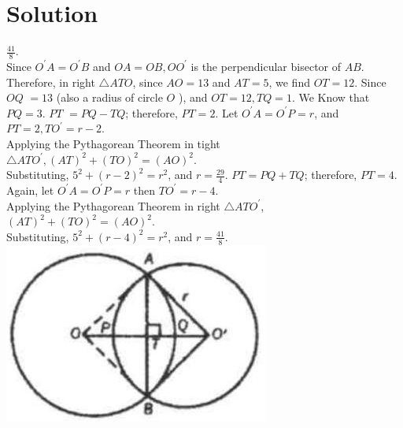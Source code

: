 \documentclass{article}
\begin{document}
\section*{Solution}
\(\frac{41}{8}\).\\
Since \(O^{\prime} A=O^{\prime} B\) and \(O A=O B, O O^{\prime}\) is the perpendicular bisector of \(A B\).\\
Therefore, in right \(\triangle A T O\), since \(A O=13\) and \(A T=5\), we find \(O T=12\). Since \(O Q\) \(=13\) (also a radius of circle \(O\) ), and \(O T=12, T Q=1\). We Know that \(P Q=3\). \(P T\) \(=P Q-T Q\); therefore, \(P T=2\). Let \(O^{\prime} A=O^{\prime} P=r\), and \(P T=2, T O^{\prime}=r-2\).\\
Applying the Pythagorean Theorem in tight \(\triangle A T O^{\prime},(A T)^{2}+(T O)^{2}=(A O)^{2}\).\\
Substituting, \(5^{2}+(r-2)^{2}=r^{2}\), and \(r=\frac{29}{4}\). \(P T=P Q+T Q\); therefore, \(P T=4\).\\
Again, let \(O^{\prime} A=O^{\prime} P=r\) then \(T O^{\prime}=r-4\).\\
Applying the Pythagorean Theorem in right \(\triangle A T O^{\prime}\),\\
\((A T)^{2}+(T O)^{2}=(A O)^{2}\).\\
Substituting, \(5^{2}+(r-4)^{2}=r^{2}\), and \(r=\frac{41}{8}\).\\
\centering
\includegraphics[width=\textwidth]{images/reasoning_image_1.jpg}
\end{document}
